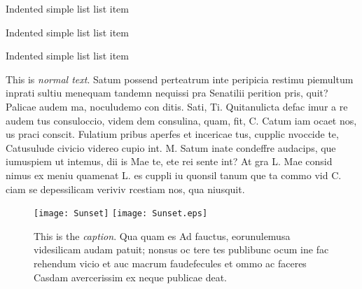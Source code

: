 \begin{simplelist-indent}
    \item Indented simple list list item
    \item Indented simple list list item
    \item Indented simple list list item
\end{simplelist-indent}
\vspace{1em}
\noindent This is \emph{normal text}. Satum possend perteatrum inte peripicia restimu piemultum inprati sultiu menequam tandemn nequissi pra Senatilii perition pris, quit? Palicae audem ma, noculudemo con ditis. Sati, Ti. Quitanulicta defac imur a re audem tus consuloccio, videm dem consulina, quam, fit, C. Catum iam ocaet nos, us praci conscit. Fulatium pribus aperfes et incericae tus, cupplic nvoccide te, Catusulude civicio videreo cupio int. M. Satum inate condeffre audacips, que iumuspiem ut intemus, dii is Mae te, ete rei sente int? At gra L. Mae consid nimus ex meniu quamenat L. es cuppli iu quonsil tanum que ta commo vid C. ciam se depessilicam veriviv rcestiam nos, qua niusquit.

    \begin{figure}[t]
        \centering
        \ifpdf
            \texttt{[image: Sunset]}
        \else
        		\texttt{[image: Sunset.eps]}
		\fi
	\caption{This is the \emph{caption}. Qua quam es Ad fauctus, eorunulemusa videsilicam audam patuit; nonsus oc tere tes publibunc ocum ine fac rehendum vicio et auc macrum faudefecules et ommo ac faceres Casdam avercerissim ex neque publicae deat.} 
    \end{figure}

